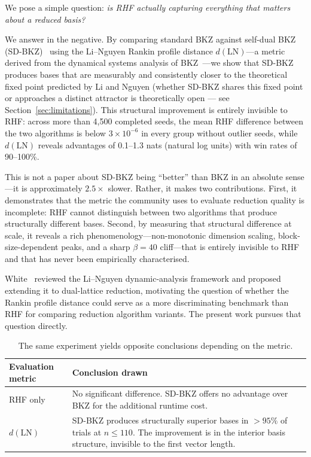 \documentclass[journal=cic,version=preprint]{iacrj}
\begin{document}
We pose a simple question: \emph{is RHF actually capturing everything that matters about a reduced basis?}

We answer in the negative. By comparing standard BKZ against self-dual BKZ (SD-BKZ)~\cite{EC:MicWal16} using the Li--Nguyen Rankin profile distance $d(\mathrm{LN})$---a metric derived from the dynamical systems analysis of BKZ~\cite{EPRINT:LiNgu20}---we show that SD-BKZ produces bases that are measurably and consistently closer to the theoretical fixed point predicted by Li and Nguyen (whether SD-BKZ shares this fixed point or approaches a distinct attractor is theoretically open --- see Section~\ref{sec:limitations}). This structural improvement is entirely invisible to RHF: across more than 4{,}500 completed seeds, the mean RHF difference between the two algorithms is below $3\times 10^{-6}$ in every group without outlier seeds, while $d(\mathrm{LN})$ reveals advantages of 0.1--1.3 nats (natural log units) with win rates of 90--100\%.

This is not a paper about SD-BKZ being ``better'' than BKZ in an absolute sense---it is approximately $2.5\times$ slower. Rather, it makes two contributions. First, it demonstrates that the metric the community uses to evaluate reduction quality is incomplete: RHF cannot distinguish between two algorithms that produce structurally different bases. Second, by measuring that structural difference at scale, it reveals a rich phenomenology---non-monotonic dimension scaling, block-size-dependent peaks, and a sharp $\beta=40$ cliff---that is entirely invisible to RHF and that has never been empirically characterised.

White~\cite{White26} reviewed the Li--Nguyen dynamic-analysis framework and proposed extending it to dual-lattice reduction, motivating the question of whether the Rankin profile distance could serve as a more discriminating benchmark than RHF for comparing reduction algorithm variants. The present work pursues that question directly.

\begin{table}[tbp]
\centering
\caption{The same experiment yields opposite conclusions depending on the metric.\label{tab:metric-split}}
\begin{tabular}{p{3.2cm}p{8.5cm}}
\hline
\textbf{Evaluation metric} & \textbf{Conclusion drawn} \\
\hline
RHF only & No significant difference. SD-BKZ offers no advantage over BKZ for the additional runtime cost. \\
$d(\mathrm{LN})$ & SD-BKZ produces structurally superior bases in $>95\%$ of trials at $n\le110$. The improvement is in the interior basis structure, invisible to the first vector length. \\
\hline
\end{tabular}
\end{table}
\end{document}
